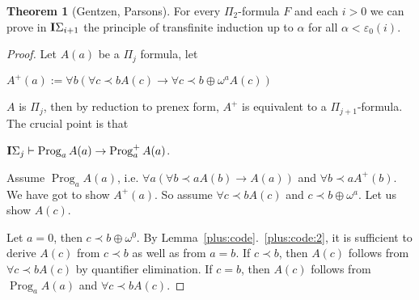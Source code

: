 \documentclass[8pt]{article}
\theoremstyle{definition}
\theoremstyle{definition}
\newtheorem{theorem}{Theorem}[section]
\theoremstyle{definition}
\theoremstyle{definition}
\theoremstyle{definition}
\theoremstyle{definition}
\theoremstyle{definition}
\theoremstyle{definition}
\theoremstyle{definition}
\theoremstyle{definition}
\theoremstyle{definition}
\theoremstyle{definition}
\theoremstyle{definition}
\theoremstyle{question}
\begin{document}
\begin{theorem}[Gentzen, Parsons]

  For every $\Pi_2$-formula $F$ and each $i > 0$ we can prove in ${\bf I}\Sigma_{i + 1}$ the 
  principle of transfinite induction up to $\alpha$ for all $\alpha < \varepsilon_0(i)$.
\end{theorem}

\begin{proof}
  Let $A(a)$ be a $\Pi_j$ formula, let
  \begin{center}
    $A^+(a) := \forall b (\forall c \prec b A(c) \to \forall c \prec b \oplus \omega^a A(c))$
  \end{center}
  $A$ is $\Pi_j$, then by reduction to prenex form, $A^+$ is equivalent to a
  $\Pi_{j + 1}$-formula. The crucial point is that
  \begin{center}
    ${\bf I}\Sigma_j \vdash \operatorname{Prog}_a A(a) \to \operatorname{Prog}^+_a A(a)$.
  \end{center}
  Assume $\operatorname{Prog}_a A(a)$, i.e. $\forall a (\forall b \prec a A(b) \to A(a))$ and
  $\forall b \prec a A^{+}(b)$. We have got to show $A^+(a)$.
  So assume $\forall c \prec b A(c)$ and $c \prec b \oplus \omega^a$. Let us show $A(c)$.

  Let $a = 0$, then $c \prec b \oplus \omega^0$. By Lemma~\ref{plus:code}.~\ref{plus:code:2}, it
  is sufficient to derive $A(c)$ from $c \prec b$ as well as from $a = b$.
  If $c \prec b$, then $A(c)$ follows from $\forall c \prec b A(c)$ by quantifier elimination. If
  $c = b$, then $A(c)$ follows from $\operatorname{Prog}_a A(a)$ and $\forall c \prec b A(c)$.


\end{proof}
\end{document}
